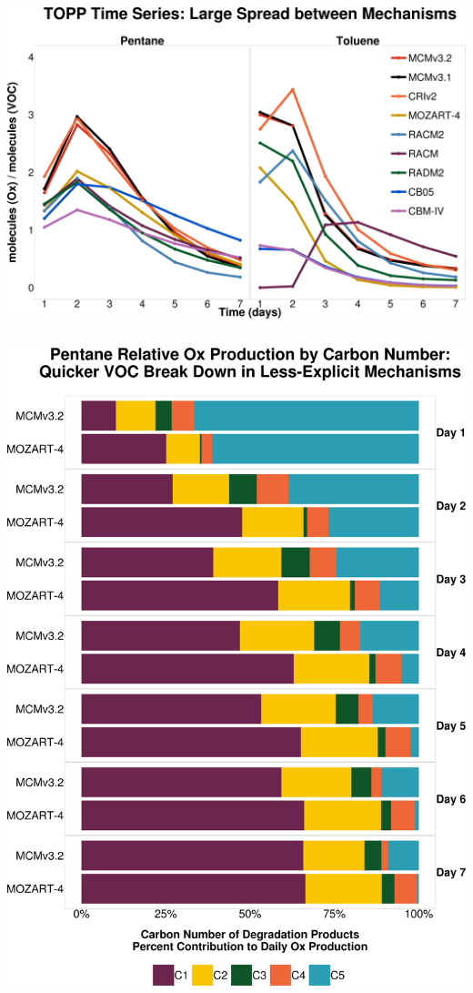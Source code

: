 \begin{GreyBox}
    \vskip-1cm
    \begin{block}{}

        \begin{center}
            \vskip-2.0cm
            \includegraphics[scale=0.2]{img/TOPPs}
        \end{center}
        \begin{columns}[c]
                \begin{center}
                    \includegraphics[scale=0.145]{img/carbon_percent_total_Ox_production}

\end{center}
\end{columns}
\end{block}
\end{GreyBox}
